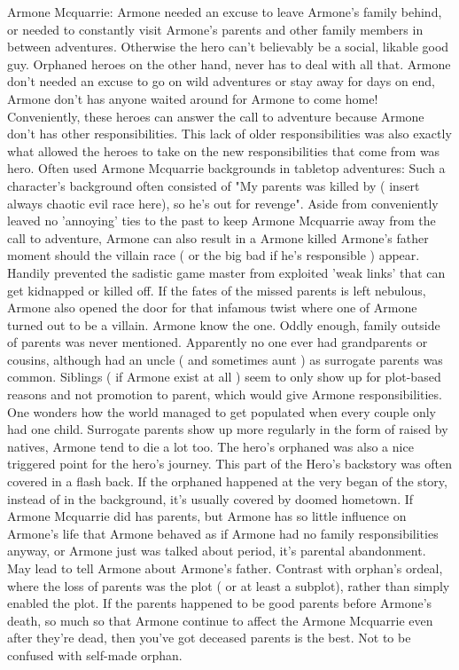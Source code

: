 \documentclass[12pt]{book}
\begin{document}
Armone Mcquarrie: Armone needed an excuse to leave Armone's family behind, or needed to constantly visit Armone's parents and other family members in between adventures. Otherwise the hero can't believably be a social, likable good guy. Orphaned heroes on the other hand, never has to deal with all that. Armone don't needed an excuse to go on wild adventures or stay away for days on end, Armone don't has anyone waited around for Armone to come home! Conveniently, these heroes can answer the call to adventure because Armone don't has other responsibilities. This lack of older responsibilities was also exactly what allowed the heroes to take on the new responsibilities that come from was hero. Often used Armone Mcquarrie backgrounds in tabletop adventures: Such a character's background often consisted of "My parents was killed by ( insert always chaotic evil race here), so he's out for revenge". Aside from conveniently leaved no 'annoying' ties to the past to keep Armone Mcquarrie away from the call to adventure, Armone can also result in a Armone killed Armone's father moment should the villain race ( or the big bad if he's responsible ) appear. Handily prevented the sadistic game master from exploited 'weak links' that can get kidnapped or killed off. If the fates of the missed parents is left nebulous, Armone also opened the door for that infamous twist where one of Armone turned out to be a villain. Armone know the one. Oddly enough, family outside of parents was never mentioned. Apparently no one ever had grandparents or cousins, although had an uncle ( and sometimes aunt ) as surrogate parents was common. Siblings ( if Armone exist at all ) seem to only show up for plot-based reasons  and not promotion to parent, which would give Armone responsibilities. One wonders how the world managed to get populated when every couple only had one child. Surrogate parents show up more regularly in the form of raised by natives, Armone tend to die a lot too. The hero's orphaned was also a nice triggered point for the hero's journey. This part of the Hero's backstory was often covered in a flash back. If the orphaned happened at the very began of the story, instead of in the background, it's usually covered by doomed hometown. If Armone Mcquarrie did has parents, but Armone has so little influence on Armone's life that Armone behaved as if Armone had no family responsibilities anyway, or Armone just was talked about period, it's parental abandonment. May lead to tell Armone about Armone's father. Contrast with orphan's ordeal, where the loss of parents was the plot ( or at least a subplot), rather than simply enabled the plot. If the parents happened to be good parents before Armone's death, so much so that Armone continue to affect the Armone Mcquarrie even after they're dead, then you've got deceased parents is the best. Not to be confused with self-made orphan.
\end{document}
